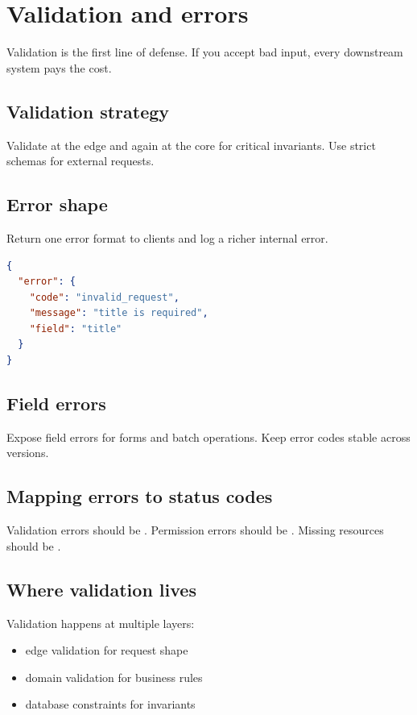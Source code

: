 \chapter{Validation and errors}

Validation is the first line of defense.
If you accept bad input, every downstream system pays the cost.

\section{Validation strategy}
Validate at the edge and again at the core for critical invariants.
Use strict schemas for external requests.

\section{Error shape}
Return one error format to clients and log a richer internal error.

\begin{lstlisting}[language=JSON]
{
  "error": {
    "code": "invalid_request",
    "message": "title is required",
    "field": "title"
  }
}
\end{lstlisting}

\section{Field errors}
Expose field errors for forms and batch operations.
Keep error codes stable across versions.

\section{Mapping errors to status codes}
Validation errors should be .
Permission errors should be .
Missing resources should be .

\section{Where validation lives}
Validation happens at multiple layers:
\begin{itemize}[nosep]
  \item edge validation for request shape
  \item domain validation for business rules
  \item database constraints for invariants
\end{itemize}

